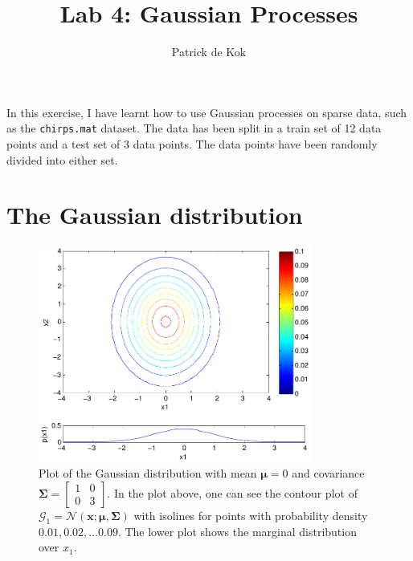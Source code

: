 \documentclass[a4paper,11pt]{article}
\title{Lab 4: Gaussian Processes}
\author{Patrick de Kok}
\newcommand{\V}[1]{\ensuremath{\mathbf{#1}}}
\newcommand{\mean}{\ensuremath{\boldsymbol{\mu}}}
\newcommand{\cov}{\ensuremath{\boldsymbol{\Sigma}}}
\newcommand{\npdf}{\ensuremath{\mathcal{N}}}
\begin{document}
\maketitle

In this exercise, I have learnt how to use Gaussian processes on sparse data, such as the \texttt{chirps.mat} dataset.  The data has been split in a train set of 12 data points and a test set of 3 data points.  The data points have been randomly divided into either set.


\section{The Gaussian distribution}
\begin{figure}
  \begin{center}
    \caption[Plot of the Gaussian distribution with covariance $\cov_{1,1} = 1, \cov_{2,2} = 3$.]{Plot of the Gaussian distribution with mean $\mean = 0$ and covariance $\cov = \begin{bmatrix}1 & 0\\0 & 3\end{bmatrix}$.  In the plot above, one can see the contour plot of $\mathcal G_1 = \npdf(\V{x} ; \mean, \cov)$ with isolines for points with probability density $0.01, 0.02, \ldots 0.09$.  The lower plot shows the marginal distribution over $x_1$.}
    \label{fig:plot1}
    \includegraphics[width=0.8\textwidth]{ex1plot1}
  \end{center}
\end{figure}
\end{document}
